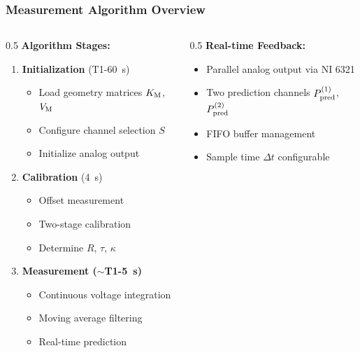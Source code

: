 \begin{frame}
    \frametitle{Measurement Algorithm Overview}
    \backgroundlogo%

    \begin{columns}
        \begin{column}{0.5\textwidth}
            \textbf{Algorithm Stages:}
            \begin{enumerate}
                \item \textbf{Initialization} (T1-\SI{60}{\second})
                    \begin{itemize}
                        \item Load geometry matrices $K_{\mathrm{M}}$, $V_{\mathrm{M}}$
                        \item Configure channel selection $S$
                        \item Initialize analog output
                    \end{itemize}
                \item \textbf{Calibration} (\SI{4}{\second})
                    \begin{itemize}
                        \item Offset measurement
                        \item Two-stage calibration
                        \item Determine $R$, $\tau$, $\kappa$
                    \end{itemize}
                \item \textbf{Measurement ($\sim$T1-\SI{5}{\second})}
                    \begin{itemize}
                        \item Continuous voltage integration
                        \item Moving average filtering
                        \item Real-time prediction
                    \end{itemize}
            \end{enumerate}
        \end{column}

        \begin{column}{0.5\textwidth}
            \textbf{Real-time Feedback:}
            \begin{itemize}
                \item Parallel analog output via NI 6321
                \item Two prediction channels $P_{\mathrm{pred}}^{\left(1\right)}$, $P_{\mathrm{pred}}^{\left(2\right)}$
                \item FIFO buffer management
                \item Sample time $\Delta t$ configurable
            \end{itemize}


\end{column}
\end{columns}
\end{frame}
